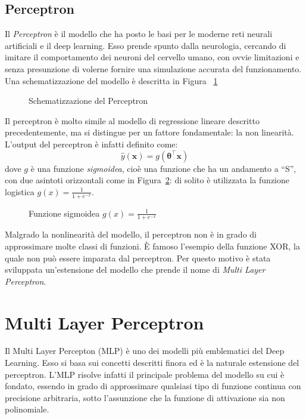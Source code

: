 \subsection{Perceptron}
Il \emph{Perceptron} è il modello che ha posto le basi per le moderne reti
neurali artificiali e il deep learning. Esso prende spunto dalla neurologia,
cercando di imitare il comportamento dei neuroni del cervello umano, con ovvie
limitazioni e senza presunzione di volerne fornire una simulazione accurata del
funzionamento. Una schematizzazione del modello è descritta in Figura%
~\ref{fig:perceptron}
\begin{figure}[H]
  \caption{Schematizzazione del Perceptron}%
  \label{fig:perceptron}
\end{figure}

Il perceptron è molto simile al modello di regressione lineare descritto
precedentemente, ma si distingue per un fattore fondamentale: la non linearità.
L'output del perceptron è infatti definito come:
\[\hat{y}(\bm x) = g(\bm \theta^\intercal \bm x)\]
dove $g$ è una funzione \emph{sigmoidea}, cioè una funzione che ha un andamento
a ``S'', con due asintoti orizzontali come in Figura~\ref{fig:sigmoid}: di
solito è utilizzata la funzione logistica $\displaystyle g(x) = \frac{1}{1 + e^{-x}}$.
\begin{figure}[H]
  \caption{Funzione sigmoidea $\displaystyle g(x) = \frac{1}{1 + e^{-x}}$ }%
  \label{fig:sigmoid}
\end{figure}

Malgrado la nonlinearità del modello, il perceptron non è in grado di
approssimare molte classi di funzioni. È famoso l'esempio della funzione XOR,
la quale non può essere imparata dal perceptron. Per questo motivo è stata
sviluppata un'estensione del modello che prende il nome di \emph{Multi Layer
  Perceptron}.
\section{Multi Layer Perceptron}
Il Multi Layer Percepton (MLP) è uno dei modelli più emblematici del Deep
Learning. Esso si basa sui concetti descritti finora ed è la naturale
estensione del perceptron. L'MLP risolve infatti il principale problema del
modello su cui è fondato, essendo in grado di approssimare qualsiasi tipo di
funzione continua con precisione arbitraria, sotto l'assunzione che la
funzione di attivazione sia non polinomiale\cite{universal-approximator}.

